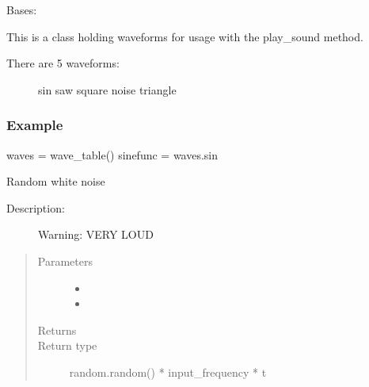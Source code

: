 \documentclass[letterpaper,10pt,english]{sphinxmanual}
\begin{document}
\begin{fulllineitems}
\label{\detokenize{dpav:dpav.audio.wave_table}}
\sphinxAtStartPar
Bases: 

\sphinxAtStartPar
This is a class holding waveforms for usage with the play\_sound method.
\begin{description}
\item[{There are 5 waveforms:}] \leavevmode
\sphinxAtStartPar
sin
saw
square
noise
triangle

\end{description}
\subsubsection*{Example}

\sphinxAtStartPar
waves = wave\_table()
sinefunc = waves.sin

\begin{fulllineitems}
\label{\detokenize{dpav:dpav.audio.wave_table.noise}}
\sphinxAtStartPar
Random white noise
\begin{description}
\item[{Description:}] \leavevmode
\sphinxAtStartPar
Warning: VERY LOUD

\end{description}
\begin{quote}\begin{description}
\item[{Parameters}] \leavevmode\begin{itemize}
\item {} 
\sphinxAtStartPar
{} \textendash{} 

\item {} 
\sphinxAtStartPar
{} \textendash{} 

\end{itemize}

\item[{Returns}] \leavevmode
\sphinxAtStartPar


\item[{Return type}] \leavevmode
\sphinxAtStartPar
random.random() * input\_frequency * t


\end{description}
\end{quote}
\end{fulllineitems}
\end{fulllineitems}
\end{document}
